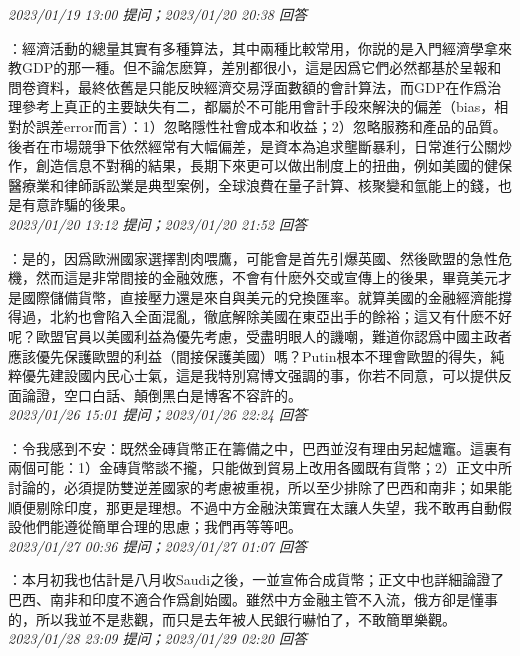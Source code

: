 \documentclass[twocolumn]{ctexart}
\begin{document}
\textit{\hfill\noindent\small 2023/01/19 13:00 提问；2023/01/20 20:38 回答}

：經濟活動的總量其實有多種算法，其中兩種比較常用，你説的是入門經濟學拿來教GDP的那一種。但不論怎麽算，差別都很小，這是因爲它們必然都基於呈報和問卷資料，最終依舊是只能反映經濟交易浮面數額的會計算法，而GDP在作爲治理參考上真正的主要缺失有二，都屬於不可能用會計手段來解決的偏差（bias，相對於誤差error而言）：1）忽略隱性社會成本和收益；2）忽略服務和產品的品質。後者在市場競爭下依然經常有大幅偏差，是資本為追求壟斷暴利，日常進行公關炒作，創造信息不對稱的結果，長期下來更可以做出制度上的扭曲，例如美國的健保醫療業和律師訴訟業是典型案例，全球浪費在量子計算、核聚變和氫能上的錢，也是有意詐騙的後果。
\\

\textit{\hfill\noindent\small 2023/01/20 13:12 提问；2023/01/20 21:52 回答}

：是的，因爲歐洲國家選擇割肉喂鷹，可能會是首先引爆英國、然後歐盟的急性危機，然而這是非常間接的金融效應，不會有什麽外交或宣傳上的後果，畢竟美元才是國際儲備貨幣，直接壓力還是來自與美元的兌換匯率。就算美國的金融經濟能撐得過，北約也會陷入全面混亂，徹底解除美國在東亞出手的餘裕；這又有什麽不好呢？歐盟官員以美國利益為優先考慮，受盡明眼人的譏嘲，難道你認爲中國主政者應該優先保護歐盟的利益（間接保護美國）嗎？Putin根本不理會歐盟的得失，純粹優先建設國内民心士氣，這是我特別寫博文强調的事，你若不同意，可以提供反面論證，空口白話、顛倒黑白是博客不容許的。
\\

\textit{\hfill\noindent\small 2023/01/26 15:01 提问；2023/01/26 22:24 回答}

：令我感到不安：既然金磚貨幣正在籌備之中，巴西並沒有理由另起爐竈。這裏有兩個可能：1）金磚貨幣談不攏，只能做到貿易上改用各國既有貨幣；2）正文中所討論的，必須提防雙逆差國家的考慮被重視，所以至少排除了巴西和南非；如果能順便剔除印度，那更是理想。不過中方金融決策實在太讓人失望，我不敢再自動假設他們能遵從簡單合理的思慮；我們再等等吧。
\\

\textit{\hfill\noindent\small 2023/01/27 00:36 提问；2023/01/27 01:07 回答}

：本月初我也估計是八月收Saudi之後，一並宣佈合成貨幣；正文中也詳細論證了巴西、南非和印度不適合作爲創始國。雖然中方金融主管不入流，俄方卻是懂事的，所以我並不是悲觀，而只是去年被人民銀行嚇怕了，不敢簡單樂觀。
\\

\textit{\hfill\noindent\small 2023/01/28 23:09 提问；2023/01/29 02:20 回答}
\end{document}
